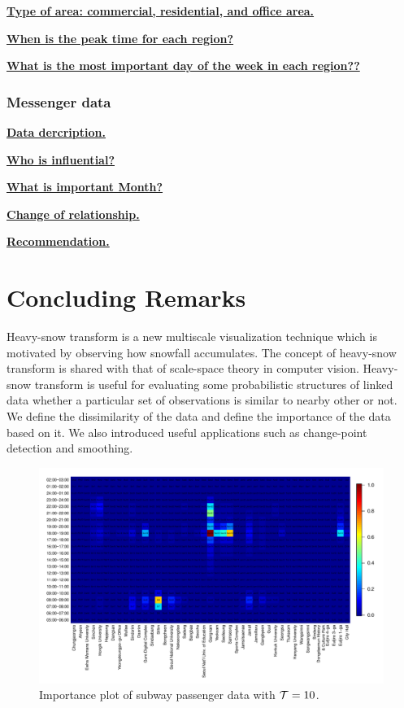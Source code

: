 \documentclass[preprint, review, 12pt]{article}
\theoremstyle{definition}
\theoremstyle{remark}
\begin{document}
\noindent\textbf{\underline{Type of area: commercial, residential, and office area.}}

\noindent\textbf{\underline{When is the peak time for each region?}}

\noindent\textbf{\underline{What is the most important day of the week in each region??}}

\subsubsection{Messenger data} 

\noindent\textbf{\underline{Data dercription.}}

\noindent\textbf{\underline{Who is influential?}}

\noindent\textbf{\underline{What is important Month?}}

\noindent\textbf{\underline{Change of relationship.}}

\noindent\textbf{\underline{Recommendation.}}



\section{Concluding Remarks}
Heavy-snow transform is a new multiscale visualization technique which is motivated by observing how snowfall accumulates. The concept of heavy-snow transform is shared with that of scale-space theory in computer vision. Heavy-snow transform is useful for evaluating some probabilistic structures of linked data whether a particular set of observations is similar to nearby other or not. We define the dissimilarity of the data and define the importance of the data based on it. We also introduced useful applications such as change-point detection and smoothing.

\begin{figure}
	\centering
	\includegraphics[width=1.05\textwidth]{Fig/In_scale_1.pdf}
	\vspace{-13mm}
	\caption{Importance plot of subway passenger data with ${\cal T}=10$.}
	\label{snow:subway_in_01}
\end{figure}
\end{document}
